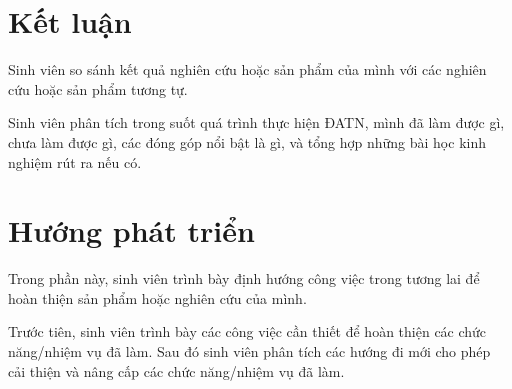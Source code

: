 \documentclass[../DoAn.tex]{subfiles}
\begin{document}
\section{Kết luận}
Sinh viên so sánh kết quả nghiên cứu hoặc sản phẩm của mình với các nghiên cứu hoặc sản phẩm tương tự.

Sinh viên phân tích trong suốt quá trình thực hiện ĐATN, mình đã làm được gì, chưa làm được gì, các đóng góp nổi bật là gì, và tổng hợp những bài học kinh nghiệm rút ra nếu có.

\section{Hướng phát triển}
Trong phần này, sinh viên trình bày định hướng công việc trong tương lai để hoàn thiện sản phẩm hoặc nghiên cứu của mình.

Trước tiên, sinh viên trình bày các công việc cần thiết để hoàn thiện các chức năng/nhiệm vụ đã làm. Sau đó sinh viên phân tích các hướng đi mới cho phép cải thiện và nâng cấp các chức năng/nhiệm vụ đã làm.
\end{document}
